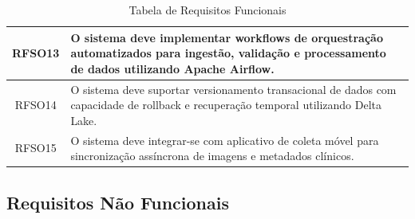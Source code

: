 \begin{table}[H]
\begin{tabular}{|c|p{12cm}|}
    RFSO13 & O sistema deve implementar workflows de orquestração automatizados para ingestão, validação e processamento de dados utilizando Apache Airflow. \\ \hline
    RFSO14 & O sistema deve suportar versionamento transacional de dados com capacidade de rollback e recuperação temporal utilizando Delta Lake. \\ \hline
    RFSO15 & O sistema deve integrar-se com aplicativo de coleta móvel para sincronização assíncrona de imagens e metadados clínicos. \\ \hline
    \end{tabular}
    \caption{Tabela de Requisitos Funcionais}
    \label{tab:requisitos_funcionais}
\end{table}

\subsection{Requisitos Não Funcionais}
